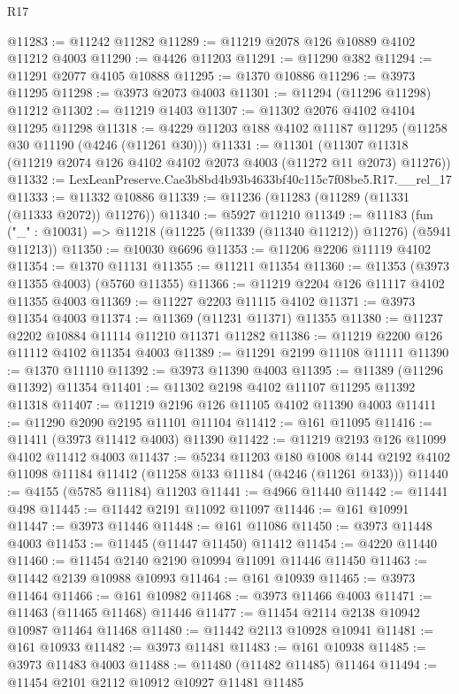 \begin{lexlean}{R17}
\begin{coremodule}
@11283 := @11242 @11282
@11289 := @11219 @2078 @126 @10889 @4102 @11212 @4003
@11290 := @4426 @11203
@11291 := @11290 @382
@11294 := @11291 @2077 @4105 @10888
@11295 := @1370 @10886
@11296 := @3973 @11295
@11298 := @3973 @2073 @4003
@11301 := @11294 (@11296 @11298) @11212
@11302 := @11219 @1403
@11307 := @11302 @2076 @4102 @4104 @11295 @11298
@11318 := @4229 @11203 @188 @4102 @11187 @11295 (@11258 @30 @11190 (@4246 (@11261 @30)))
@11331 := @11301
    (@11307 @11318 (@11219 @2074 @126 @4102 @4102 @2073 @4003 (@11272 @11 @2073) @11276))
@11332 := LexLeanPreserve.Cae3b8bd4b93b4633bf40c115c7f08be5.R17.__rel_17
@11333 := @11332 @10886
@11339 := @11236 (@11283 (@11289 (@11331 (@11333 @2072)) @11276))
@11340 := @5927 @11210
@11349 := @11183
    (fun ("_" : @10031) => @11218 (@11225 (@11339 (@11340 @11212)) @11276) (@5941 @11213))
@11350 := @10030 @6696
@11353 := @11206 @2206 @11119 @4102
@11354 := @1370 @11131
@11355 := @11211 @11354
@11360 := @11353 (@3973 @11355 @4003) (@5760 @11355)
@11366 := @11219 @2204 @126 @11117 @4102 @11355 @4003
@11369 := @11227 @2203 @11115 @4102
@11371 := @3973 @11354 @4003
@11374 := @11369 (@11231 @11371) @11355
@11380 := @11237 @2202 @10884 @11114 @11210 @11371 @11282
@11386 := @11219 @2200 @126 @11112 @4102 @11354 @4003
@11389 := @11291 @2199 @11108 @11111
@11390 := @1370 @11110
@11392 := @3973 @11390 @4003
@11395 := @11389 (@11296 @11392) @11354
@11401 := @11302 @2198 @4102 @11107 @11295 @11392 @11318
@11407 := @11219 @2196 @126 @11105 @4102 @11390 @4003
@11411 := @11290 @2090 @2195 @11101 @11104
@11412 := @161 @11095
@11416 := @11411 (@3973 @11412 @4003) @11390
@11422 := @11219 @2193 @126 @11099 @4102 @11412 @4003
@11437 := @5234
    @11203
    @180
    @1008
    @144
    @2192
    @4102
    @11098
    @11184
    @11412
    (@11258 @133 @11184 (@4246 (@11261 @133)))
@11440 := @4155 (@5785 @11184) @11203
@11441 := @4966 @11440
@11442 := @11441 @498
@11445 := @11442 @2191 @11092 @11097
@11446 := @161 @10991
@11447 := @3973 @11446
@11448 := @161 @11086
@11450 := @3973 @11448 @4003
@11453 := @11445 (@11447 @11450) @11412
@11454 := @4220 @11440
@11460 := @11454 @2140 @2190 @10994 @11091 @11446 @11450
@11463 := @11442 @2139 @10988 @10993
@11464 := @161 @10939
@11465 := @3973 @11464
@11466 := @161 @10982
@11468 := @3973 @11466 @4003
@11471 := @11463 (@11465 @11468) @11446
@11477 := @11454 @2114 @2138 @10942 @10987 @11464 @11468
@11480 := @11442 @2113 @10928 @10941
@11481 := @161 @10933
@11482 := @3973 @11481
@11483 := @161 @10938
@11485 := @3973 @11483 @4003
@11488 := @11480 (@11482 @11485) @11464
@11494 := @11454 @2101 @2112 @10912 @10927 @11481 @11485

\end{coremodule}
\end{lexlean}
